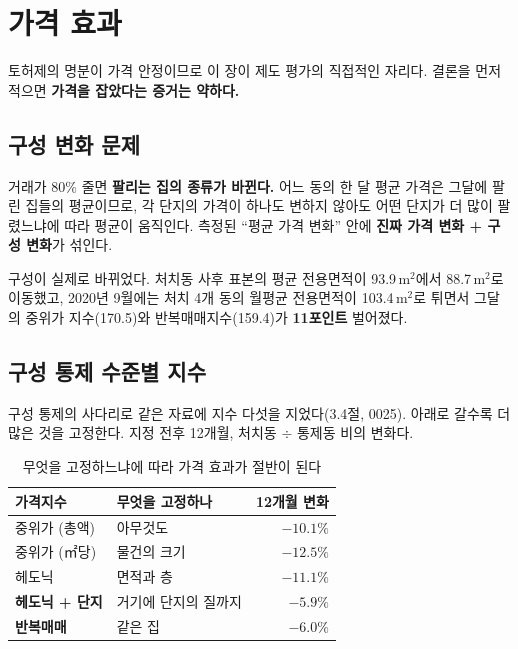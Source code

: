 
\section{가격 효과}

토허제의 명분이 가격 안정이므로 이 장이 제도 평가의 직접적인 자리다. 결론을 먼저
적으면 \textbf{가격을 잡았다는 증거는 약하다.}

\subsection{구성 변화 문제}

거래가 80\% 줄면 \textbf{팔리는 집의 종류가 바뀐다.} 어느 동의 한 달 평균 가격은
그달에 팔린 집들의 평균이므로, 각 단지의 가격이 하나도 변하지 않아도 어떤 단지가
더 많이 팔렸느냐에 따라 평균이 움직인다. 측정된 ``평균 가격 변화'' 안에
\textbf{진짜 가격 변화 + 구성 변화}가 섞인다.

구성이 실제로 바뀌었다. 처치동 사후 표본의 평균 전용면적이 93.9\,m$^2$에서
88.7\,m$^2$로 이동했고, 2020년 9월에는 처치 4개 동의 월평균 전용면적이
103.4\,m$^2$로 튀면서 그달의 중위가 지수(170.5)와 반복매매지수(159.4)가
\textbf{11포인트} 벌어졌다.

\subsection{구성 통제 수준별 지수}

구성 통제의 사다리로 같은 자료에 지수 다섯을 지었다(3.4절, 0025). 아래로 갈수록
더 많은 것을 고정한다. 지정 전후 12개월, 처치동 $\div$ 통제동 비의 변화다.

\begin{table}[htbp]
  \centering
  \caption{무엇을 고정하느냐에 따라 가격 효과가 절반이 된다}
  \label{tab:price-ladder}
  \begin{tabular}{llr}
    \toprule
    \textbf{가격지수} & \textbf{무엇을 고정하나} & \textbf{12개월 변화} \\
    \midrule
    중위가 (총액) & 아무것도 & $-10.1\%$ \\
    중위가 (㎡당) & 물건의 크기 & $-12.5\%$ \\
    헤도닉 & 면적과 층 & $-11.1\%$ \\
    \textbf{헤도닉 + 단지} & 거기에 단지의 질까지 & $\mathbf{-5.9\%}$ \\
    \textbf{반복매매} & 같은 집 & $\mathbf{-6.0\%}$ \\
    \bottomrule
  \end{tabular}
\end{table}


